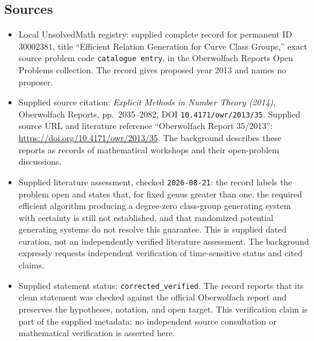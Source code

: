 \documentclass[11pt]{article}
\begin{document}
\subsection{Sources}
\begin{itemize}
\item Local UnsolvedMath registry: supplied complete record for permanent ID \(30002381\), title ``Efficient Relation Generation for Curve Class Groups,'' exact source problem code \texttt{catalogue entry}, in the Oberwolfach Reports Open Problems collection. The record gives proposed year 2013 and names no proposer.
\item Supplied source citation: \emph{Explicit Methods in Number Theory (2014)}, Oberwolfach Reports, pp.~2035--2082, DOI \texttt{10.4171/owr/2013/35}. Supplied source URL and literature reference ``Oberwolfach Report 35/2013'': \url{https://doi.org/10.4171/owr/2013/35}. The background describes these reports as records of mathematical workshops and their open-problem discussions.
\item Supplied literature assessment, checked \texttt{2026-08-21}: the record labels the problem open and states that, for fixed genus greater than one, the required efficient algorithm producing a degree-zero class-group generating system with certainty is still not established, and that randomized potential generating systems do not resolve this guarantee. This is supplied dated curation, not an independently verified literature assessment. The background expressly requests independent verification of time-sensitive status and cited claims.
\item Supplied statement status: \texttt{corrected\_verified}. The record reports that its clean statement was checked against the official Oberwolfach report and preserves the hypotheses, notation, and open target. This verification claim is part of the supplied metadata; no independent source consultation or mathematical verification is asserted here.
\end{itemize}
\end{document}
